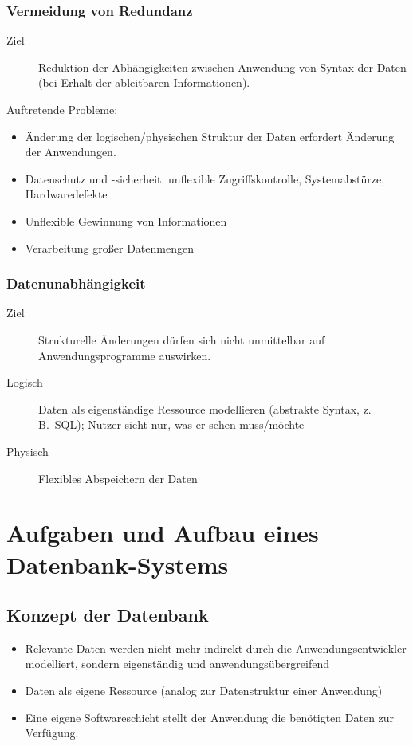 \subsection{Vermeidung von Redundanz}
\begin{description}
  \item [{Ziel}] 
	Reduktion der Abhängigkeiten zwischen Anwendung von Syntax der Daten (bei Erhalt der ableitbaren Informationen).
\end{description}
Auftretende Probleme:
\begin{itemize}
  \item Änderung der logischen/physischen Struktur der Daten erfordert Änderung der Anwendungen.
  \item {}
	Datenschutz und -sicherheit: unflexible Zugriffskontrolle, Systemabstürze, Hardwaredefekte
  \item Unflexible Gewinnung von Informationen
  \item Verarbeitung großer Datenmengen
\end{itemize}

\subsection{Datenunabhängigkeit}
\begin{description}
  \item [{Ziel}] 
	Strukturelle Änderungen dürfen sich nicht unmittelbar auf Anwendungsprogramme auswirken.
  \item [{Logisch}]
	Daten als eigenständige Ressource modellieren (abstrakte Syntax, z.\,B.~SQL); Nutzer sieht nur, was er sehen muss\slash{}möchte
  \item [{Physisch}]
	Flexibles Abspeichern der Daten
\end{description}

\chapter{Aufgaben und Aufbau eines Datenbank-Systems}


\section{Konzept der Datenbank}
\begin{itemize}
  \item Relevante Daten werden nicht mehr indirekt durch die Anwendungsentwickler modelliert, sondern eigenständig und anwendungsübergreifend
  \item {}Daten als eigene Ressource (analog zur Datenstruktur einer Anwendung)
  \item {}Eine eigene Softwareschicht stellt der Anwendung die benötigten Daten zur Verfügung.
\end{itemize}

